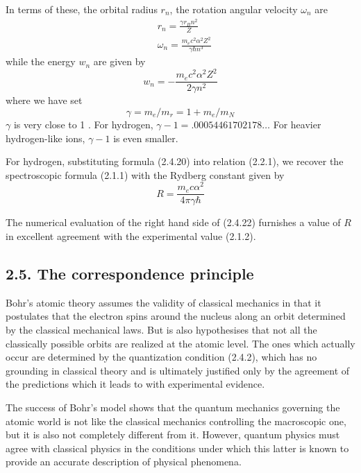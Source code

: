 \documentclass{article}
\begin{document}
In terms of these, the orbital radius $r_{n}$, the rotation angular velocity $\omega_{n}$ are
$$
\begin{align*}
& r_{n}=\frac{\gamma r_{B} n^{2}}{Z}  \tag{2.4.18}\\
& \omega_{n}=\frac{m_{e} c^{2} \alpha^{2} Z^{2}}{\gamma \hbar n^{3}} \tag{2.4.19}
\end{align*}
$$
while the energy $w_{n}$ are given by
$$
\begin{equation*}
w_{n}=-\frac{m_{e} c^{2} \alpha^{2} Z^{2}}{2 \gamma n^{2}} \tag{2.4.20}
\end{equation*}
$$
where we have set
$$
\begin{equation*}
\gamma=m_{e} / m_{r}=1+m_{e} / m_{N} \tag{2.4.21}
\end{equation*}
$$
$\gamma$ is very close to 1 . For hydrogen, $\gamma-1=.00054461702178 \ldots$ For heavier hydrogen-like ions, $\gamma-1$ is even smaller.

For hydrogen, substituting formula (2.4.20) into relation (2.2.1), we recover the spectroscopic formula (2.1.1) with the Rydberg constant given by
$$
\begin{equation*}
R=\frac{m_{e} c \alpha^{2}}{4 \pi \gamma \hbar} \tag{2.4.22}
\end{equation*}
$$

The numerical evaluation of the right hand side of (2.4.22) furnishes a value of $R$ in excellent agreement with the experimental value (2.1.2).

\subsection*{2.5. The correspondence principle}

Bohr's atomic theory assumes the validity of classical mechanics in that it postulates that the electron spins around the nucleus along an orbit determined by the classical mechanical laws. But is also hypothesises that not all the classically possible orbits are realized at the atomic level. The ones which actually occur are determined by the quantization condition (2.4.2), which has no grounding in classical theory and is ultimately justified only by the agreement of the predictions which it leads to with experimental evidence.

The success of Bohr's model shows that the quantum mechanics governing the atomic world is not like the classical mechanics controlling the macroscopic one, but it is also not completely different from it. However,
quantum physics must agree with classical physics in the conditions under which this latter is known to provide an accurate description of physical phenomena.
\end{document}
